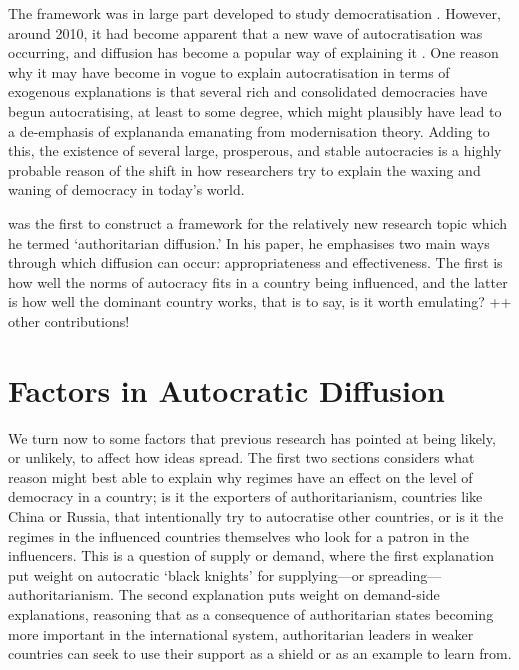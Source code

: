 The framework was in large part developed to study democratisation \citep{elkins_waves_2005, huntington_third_1991}. However, around 2010, it had become apparent that a new wave of autocratisation was occurring, and diffusion has become a popular way of explaining it \citep{ambrosio_constructing_2010, gelman_authoritarian_2008, lankina_authoritarian_2016, weyland_autocratic_2017}. One reason why it may have become in vogue to explain autocratisation in terms of exogenous explanations is that several rich and consolidated democracies have begun autocratising, at least to some degree, which might plausibly have lead to a de-emphasis of explananda emanating from modernisation theory. Adding to this, the existence of several large, prosperous, and stable autocracies is a highly probable reason of the shift in how researchers try to explain the waxing and waning of democracy in today's world. 

\citet{ambrosio_constructing_2010} was the first to construct a framework for the relatively new research topic which he termed `authoritarian diffusion.' In his paper, he emphasises two main ways through which diffusion can occur: appropriateness and effectiveness. The first is how well the norms of autocracy fits in a country being influenced, and the latter is how well the dominant country works, that is to say, is it worth emulating? ++ other contributions!

\section{Factors in Autocratic Diffusion}
We turn now to some factors that previous research has pointed at being likely, or unlikely, to affect how ideas spread.  The first two sections considers what reason might best able to explain why regimes have an effect on the level of democracy in a country; is it the exporters of authoritarianism, countries like China or Russia, that intentionally try to autocratise other countries, or is it the regimes in the influenced countries themselves who look for a patron in the influencers. This is a question of supply or demand, where the first explanation put weight on autocratic `black knights' for supplying---or spreading---authoritarianism. The second explanation puts weight on demand-side explanations, reasoning that as a consequence of authoritarian states becoming more important in the international system, authoritarian leaders in weaker countries can seek to use their support as a shield or as an example to learn from. 

